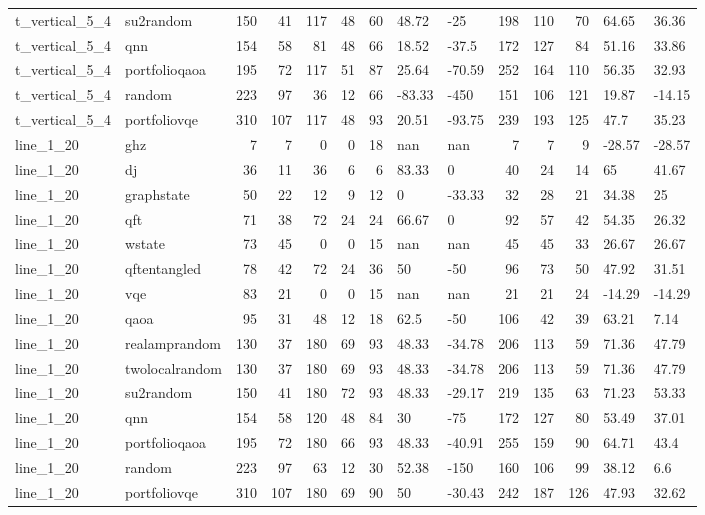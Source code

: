 \begin{longtable}{llrrrrrllrrrll}
t\_vertical\_5\_4 & su2random & 150 & 41 & 117 & 48 & 60 & 48.72 & -25 & 198 & 110 & 70 & 64.65 & 36.36 \\
t\_vertical\_5\_4 & qnn & 154 & 58 & 81 & 48 & 66 & 18.52 & -37.5 & 172 & 127 & 84 & 51.16 & 33.86 \\
t\_vertical\_5\_4 & portfolioqaoa & 195 & 72 & 117 & 51 & 87 & 25.64 & -70.59 & 252 & 164 & 110 & 56.35 & 32.93 \\
t\_vertical\_5\_4 & random & 223 & 97 & 36 & 12 & 66 & -83.33 & -450 & 151 & 106 & 121 & 19.87 & -14.15 \\
t\_vertical\_5\_4 & portfoliovqe & 310 & 107 & 117 & 48 & 93 & 20.51 & -93.75 & 239 & 193 & 125 & 47.7 & 35.23 \\
line\_1\_20 & ghz & 7 & 7 & 0 & 0 & 18 & nan & nan & 7 & 7 & 9 & -28.57 & -28.57 \\
line\_1\_20 & dj & 36 & 11 & 36 & 6 & 6 & 83.33 & 0 & 40 & 24 & 14 & 65 & 41.67 \\
line\_1\_20 & graphstate & 50 & 22 & 12 & 9 & 12 & 0 & -33.33 & 32 & 28 & 21 & 34.38 & 25 \\
line\_1\_20 & qft & 71 & 38 & 72 & 24 & 24 & 66.67 & 0 & 92 & 57 & 42 & 54.35 & 26.32 \\
line\_1\_20 & wstate & 73 & 45 & 0 & 0 & 15 & nan & nan & 45 & 45 & 33 & 26.67 & 26.67 \\
line\_1\_20 & qftentangled & 78 & 42 & 72 & 24 & 36 & 50 & -50 & 96 & 73 & 50 & 47.92 & 31.51 \\
line\_1\_20 & vqe & 83 & 21 & 0 & 0 & 15 & nan & nan & 21 & 21 & 24 & -14.29 & -14.29 \\
line\_1\_20 & qaoa & 95 & 31 & 48 & 12 & 18 & 62.5 & -50 & 106 & 42 & 39 & 63.21 & 7.14 \\
line\_1\_20 & realamprandom & 130 & 37 & 180 & 69 & 93 & 48.33 & -34.78 & 206 & 113 & 59 & 71.36 & 47.79 \\
line\_1\_20 & twolocalrandom & 130 & 37 & 180 & 69 & 93 & 48.33 & -34.78 & 206 & 113 & 59 & 71.36 & 47.79 \\
line\_1\_20 & su2random & 150 & 41 & 180 & 72 & 93 & 48.33 & -29.17 & 219 & 135 & 63 & 71.23 & 53.33 \\
line\_1\_20 & qnn & 154 & 58 & 120 & 48 & 84 & 30 & -75 & 172 & 127 & 80 & 53.49 & 37.01 \\
line\_1\_20 & portfolioqaoa & 195 & 72 & 180 & 66 & 93 & 48.33 & -40.91 & 255 & 159 & 90 & 64.71 & 43.4 \\
line\_1\_20 & random & 223 & 97 & 63 & 12 & 30 & 52.38 & -150 & 160 & 106 & 99 & 38.12 & 6.6 \\
line\_1\_20 & portfoliovqe & 310 & 107 & 180 & 69 & 90 & 50 & -30.43 & 242 & 187 & 126 & 47.93 & 32.62 \\
\end{longtable}

